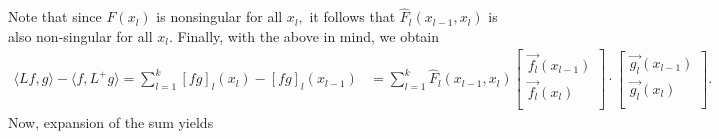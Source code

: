 \documentclass[11pt,reqno,oneside,a4paper]{article}
\theoremstyle{plain} %
\theoremstyle{definition}
\theoremstyle{remark}
\begin{document}
Note that since $F(x_l)$ is nonsingular for all $x_l,$ it follows that $\widehat{F}_l(x_{l-1}, x_l)$ is also non-singular for all $x_l$. Finally, with the above in mind, we obtain
\begin{align*}
\langle Lf,g\rangle - \langle f,L^+ g\rangle = \sum_{l=1}^{k} [fg]_l(x_l) - [fg]_l(x_{l-1}) &=  \sum_{l=1}^{k} \widehat{F}_l(x_{l-1}, x_l)  
\begin{bmatrix}
\vec{f_l}(x_{l-1})  \\
\vec{f_l}(x_{l})  \\
\end{bmatrix}
\cdot
\begin{bmatrix}
\vec{g_l}(x_{l-1})  \\
\vec{g_l}(x_{l})  \\
\end{bmatrix} .
\end{align*}
Now, expansion of the sum yields
\end{document}
